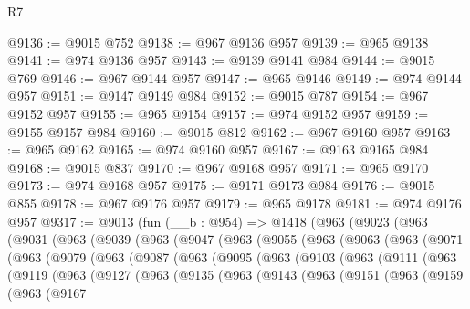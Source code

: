 \begin{lexlean}{R7}
\begin{coremodule}
@9136 := @9015 @752
@9138 := @967 @9136 @957
@9139 := @965 @9138
@9141 := @974 @9136 @957
@9143 := @9139 @9141 @984
@9144 := @9015 @769
@9146 := @967 @9144 @957
@9147 := @965 @9146
@9149 := @974 @9144 @957
@9151 := @9147 @9149 @984
@9152 := @9015 @787
@9154 := @967 @9152 @957
@9155 := @965 @9154
@9157 := @974 @9152 @957
@9159 := @9155 @9157 @984
@9160 := @9015 @812
@9162 := @967 @9160 @957
@9163 := @965 @9162
@9165 := @974 @9160 @957
@9167 := @9163 @9165 @984
@9168 := @9015 @837
@9170 := @967 @9168 @957
@9171 := @965 @9170
@9173 := @974 @9168 @957
@9175 := @9171 @9173 @984
@9176 := @9015 @855
@9178 := @967 @9176 @957
@9179 := @965 @9178
@9181 := @974 @9176 @957
@9317 := @9013
    (fun (__b : @954) =>
    @1418
      (@963
        (@9023
          (@963
            (@9031
              (@963
                (@9039
                  (@963
                    (@9047
                      (@963
                        (@9055
                          (@963
                            (@9063
                              (@963
                                (@9071
                                  (@963
                                    (@9079
                                      (@963
                                        (@9087
                                          (@963
                                            (@9095
                                              (@963
                                                (@9103
                                                  (@963
                                                    (@9111
                                                      (@963
                                                        (@9119
                                                          (@963
                                                            (@9127
                                                              (@963
                                                                (@9135
                                                                  (@963
                                                                    (@9143
                                                                      (@963
                                                                        (@9151
                                                                          (@963
                                                                            (@9159
                                                                              (@963
                                                                                (@9167

\end{coremodule}
\end{lexlean}

